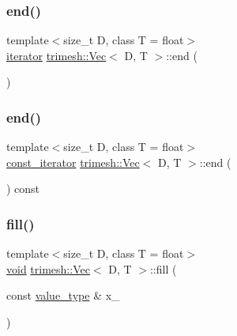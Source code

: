 \mbox{\label{classtrimesh_1_1Vec_aeff673d77a703739a055dc2b70961ba7}} 
\subsubsection{\texorpdfstring{end()}{end()}\hspace{0.1cm}{\footnotesize\ttfamily [1/2]}}
{\footnotesize\ttfamily template$<$size\+\_\+t D, class T = float$>$ \\
\hyperlink{classtrimesh_1_1Vec_ae21cfb5c00b53dc906ddc4f939ca8d22}{iterator} \hyperlink{classtrimesh_1_1Vec}{trimesh\+::\+Vec}$<$ D, T $>$\+::end (\begin{DoxyParamCaption}{ }\end{DoxyParamCaption})\hspace{0.3cm}{\ttfamily [inline]}}

\mbox{\label{classtrimesh_1_1Vec_accb0f220dfd97d137b880758548320bd}} 
\subsubsection{\texorpdfstring{end()}{end()}\hspace{0.1cm}{\footnotesize\ttfamily [2/2]}}
{\footnotesize\ttfamily template$<$size\+\_\+t D, class T = float$>$ \\
\hyperlink{classtrimesh_1_1Vec_a3bd4f0e8856d283ef56a63a106881bb9}{const\+\_\+iterator} \hyperlink{classtrimesh_1_1Vec}{trimesh\+::\+Vec}$<$ D, T $>$\+::end (\begin{DoxyParamCaption}{ }\end{DoxyParamCaption}) const\hspace{0.3cm}{\ttfamily [inline]}}

\mbox{\label{classtrimesh_1_1Vec_a2f4ba7e8355dac052256b11bf46ead69}} 
\subsubsection{\texorpdfstring{fill()}{fill()}}
{\footnotesize\ttfamily template$<$size\+\_\+t D, class T = float$>$ \\
\hyperlink{namespacetrimesh_a784ddfd979e1c579bda795a8edfc3f43}{void} \hyperlink{classtrimesh_1_1Vec}{trimesh\+::\+Vec}$<$ D, T $>$\+::fill (\begin{DoxyParamCaption}\item[{const \hyperlink{classtrimesh_1_1Vec_a10a59253996e42d67c713f37592669df}{value\+\_\+type} \&}]{x\+\_\+ }\end{DoxyParamCaption})\hspace{0.3cm}{\ttfamily [inline]}}

